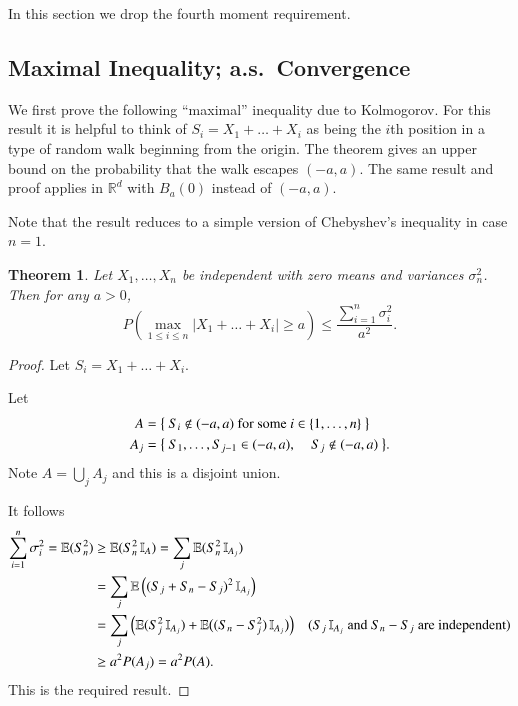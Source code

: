 \documentclass[a4paper]{amsart}
\theoremstyle{plain}
\newtheorem{theorem}{Theorem}[section]
\theoremstyle{definition}
\theoremstyle{remark}
\begin{document}
In this section we drop the fourth moment requirement.

\subsection{Maximal Inequality; a.s.\ Convergence}

 We first prove the following ``maximal'' inequality due to Kolmogorov. 
For this result it is helpful to think of $ S_i = X_1+ \dots +   X_i $ as being the $ i$th position in a type of random walk beginning from the origin. The theorem gives an upper bound on the probability that the walk escapes $ (-a,a) $. 
The same result and proof applies in $ \mathbb{R}^d  $ with $ B_a(0) $ instead of $ (-a,a) $.  

%
 

\medskip Note that the result reduces to a simple version of Chebyshev's inequality in case $ n=1 $.

\begin{theorem} Let $ X_1,\dots, X_n $ be independent with zero means and variances $ \sigma _n^2 $. Then for any $ a > 0 $, 
\[
P \left( \max_{1\leq i \leq n} |X_1+\dots+ X_i | \geq a \right) \leq \frac { \sum_{i=1}^n \sigma _i^2 } { a^2 }.
\]
\end{theorem} 

\begin{proof} Let $ S_i = X_1 +  \dots + X_i $.

Let
\begin{align*}
A &= \big\{\text{ $ S_i \notin (-a,a) $ for some $ i \in \{1,\dots, n \} $ }\big\} \\
A_j &= \big\{\text{ $ S_1,\dots, S_{j-1} \in (-a,a) $, \quad   $ S_j \notin (-a,a) $ }\big\}.
\end{align*} 
Note $ A = \bigcup_j A_j $ and this is a disjoint union.

It follows
\begin{align*}
\sum_{i=1}^n \sigma _i ^2  = \mathbb{E} (S_n^2) &\geq \mathbb{E} (S_n^2 \, \mathbb{I}_A)  
    = \sum_j \mathbb{E}  (S_n^2\,  \mathbb{I}_{A_j})  \\
   &= \sum_j \mathbb{E} \left( (S_j + S_n-S_j)^2\,  \mathbb{I}_{A_j}\right)  \\
   &= \sum_j \Big( \mathbb{E} (S_j^2\, \mathbb{I}_{A_j}) + \mathbb{E}\big( (S_n - S_j^2)\, \mathbb{I}_{A_j}\big) \Big)
      \quad \text{($ S_j \, \mathbb{I}_{A_j}$ and $ S_n - S_j $ are independent)} \\
      &\geq a^2 P(A_j)  
       = a^2 P(A) . 
\end{align*}  
This is the required result.
\end{proof} 
 
\end{document}
